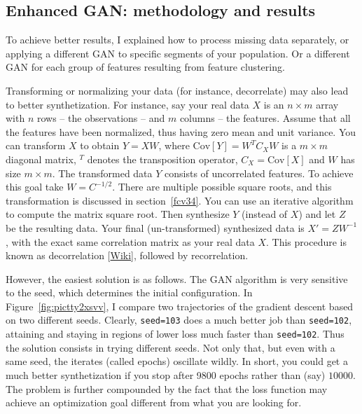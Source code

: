 \documentclass[oneside,10pt]{book}
\begin{document}
\subsection{Enhanced GAN: methodology and results}\label{enhgfd}

To achieve better results, I explained how to process missing data separately, or applying a different GAN to specific segments of your
 population. Or a different GAN for each group of features resulting from \textcolor{index}{feature clustering}.

 Transforming or normalizing your data (for instance, decorrelate) may also lead to better synthetization. For instance, say your real
 data $X$ is an $n\times m$ array with $n$ rows -- the observations -- and $m$ columns -- the features. Assume that all the features have been normalized, thus having zero mean and unit variance. You can transform $X$ to obtain $Y=XW$, where
 $\text{Cov}[Y]= W^T C_X W$ is a $m \times m$ diagonal matrix, $^T$ denotes the transposition operator, $C_X=\text{Cov}[X]$ and $W$ has size $m\times m$. The transformed data $Y$ consists of uncorrelated features. To achieve this goal take $W=C^{-1/2}$. There are multiple possible square roots, and this transformation is discussed in section~\ref{fcv34}. You can use an iterative algorithm to compute the 
 \textcolor{index}{matrix square root}. Then synthesize $Y$ (instead of $X$) and let $Z$ be the resulting data. Your final (un-transformed) synthesized data  is $X'=ZW^{-1}$, with the exact same correlation matrix as your real data $X$.
 This procedure is known as \textcolor{index}{decorrelation} [\href{https://en.wikipedia.org/wiki/Decorrelation}{Wiki}], followed by recorrelation. 

However, the easiest solution is as follows. The GAN algorithm is very sensitive to the 
\textcolor{index}{seed}, which determines the initial configuration. In Figure~\ref{fig:pictty2xsvv}, I  compare two trajectories of the gradient descent
 based on two different seeds. Clearly, \texttt{seed=103} does a much better job than \texttt{seed=102}, attaining 
 and staying in regions of lower loss much faster than \texttt{seed=102}. Thus the solution consists in trying different seeds. Not only that, but even with a same seed, the iterates (called \textcolor{index}{epochs}) oscillate wildly. In short, you could get
 a much better synthetization if you stop after 9800 epochs rather than (say) $\num{10000}$. The problem is
 further compounded by the fact that the \textcolor{index}{loss function} may achieve an optimization goal different from what you are looking for.
\end{document}
